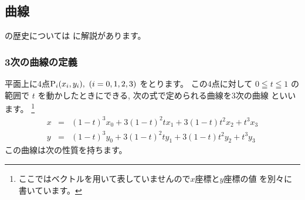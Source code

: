 \subsection{\Bezier 曲線}
の歴史については
\cite[p.13--14]{Metafont}に解説があります。
\subsubsection{3次の\Bezier 曲線の定義}
平面上に4点${\rm P}_i(x_i,y_i),\ (i=0,1,2,3)$ をとります。
この4点に対して $0\leqq t \leqq 1$ の範囲で
$t$ を動かしたときにできる, 次の式で定められる曲線を$3$次の\Bezier 曲線
といいます。
\footnote{ここではベクトルを用いて表していませんので$x$座標と$y$座標の値
を別々に書いています。}
\begin{eqnarray}
 x&=&(1-t)^3x_0+3(1-t)^2tx_1+3(1-t)t^2x_2+t^3x_3\label{Bezierx}\\
 y&=&(1-t)^3y_0+3(1-t)^2ty_1+3(1-t)t^2y_2+t^3y_3\label{Beziery}
\end{eqnarray}
この曲線は次の性質を持ちます。
